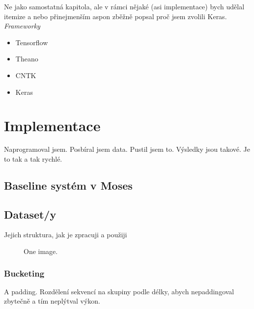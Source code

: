 Ne jako samostatná kapitola, ale v rámci nějaké (asi implementace) bych udělal itemize a nebo přinejmenším aspon zběžně popsal proč jsem zvolili Keras.
\emph{Frameworky}
\begin{itemize}
  \item Tensorflow
  \item Theano
  \item CNTK
  \item Keras
\end{itemize}


\chapter{Implementace}
Naprogramoval jsem.
Posbíral jsem data.
Pustil jsem to.
Výsledky jsou takové.
Je to tak a tak rychlé.

\section{Baseline systém v Moses}

\section{Dataset/y}
Jejich struktura, jak je zpracuji a použiji

\begin{figure}
    \begin{center}
    \end{center}
	\caption{One image. }
	\label{img:TODO}
\end{figure}


\subsection{Bucketing}
A padding. Rozdělení sekvencí na skupiny podle délky, abych nepaddingoval zbytečně a tím neplýtval výkon. 

